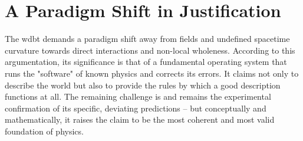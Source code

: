 \section{A Paradigm Shift in Justification}
The \gls{wdbt} demands a paradigm shift away from fields and undefined spacetime curvature towards direct interactions and non-local wholeness. According to this argumentation, its significance is that of a fundamental operating system that runs the "software" of known physics and corrects its errors. It claims not only to describe the world but also to provide the rules by which a good description functions at all. The remaining challenge is and remains the experimental confirmation of its specific, deviating predictions – but conceptually and mathematically, it raises the claim to be the most coherent and most valid foundation of physics.